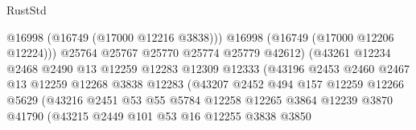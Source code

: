 \begin{lexlean}{RustStd}
\begin{coremodule}
                                          @16998
                                          (@16749 (@17000 @12216 @3838)))
                                        @16998
                                        (@16749 (@17000 @12206 @12224)))
                                      @25764
                                      @25767
                                      @25770
                                      @25774
                                      @25779
                                      @42612)
                                    (@43261
                                      @12234
                                      @2468
                                      @2490
                                      @13
                                      @12259
                                      @12283
                                      @12309
                                      @12333
                                      (@43196
                                        @2453
                                        @2460
                                        @2467
                                        @13
                                        @12259
                                        @12268
                                        @3838
                                        @12283
                                        (@43207
                                          @2452
                                          @494
                                          @157
                                          @12259
                                          @12266
                                          @5629
                                          (@43216
                                            @2451
                                            @53
                                            @55
                                            @5784
                                            @12258
                                            @12265
                                            @3864
                                            @12239
                                            @3870
                                            @41790
                                            (@43215
                                              @2449
                                              @101
                                              @53
                                              @16
                                              @12255
                                              @3838
                                              @3850

\end{coremodule}
\end{lexlean}
